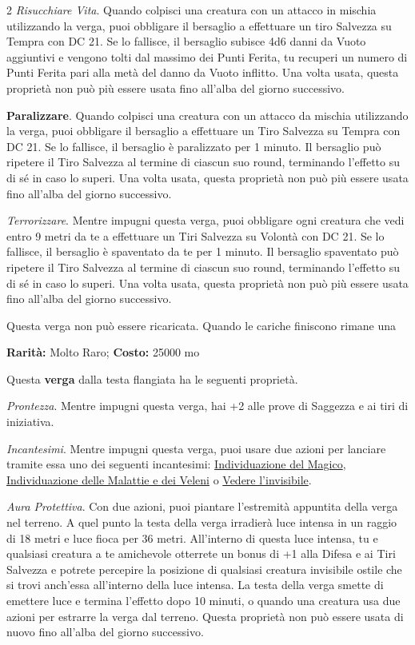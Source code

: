 \begin{multicols}{2}
\emph{Risucchiare Vita}. Quando colpisci una creatura con un attacco in mischia utilizzando la verga, puoi obbligare il bersaglio a effettuare un tiro Salvezza su Tempra con DC 21. Se lo fallisce, il bersaglio subisce 4d6 danni da Vuoto aggiuntivi e vengono tolti dal massimo dei Punti Ferita, tu recuperi un numero di Punti Ferita pari alla metà del danno da Vuoto inflitto. Una volta usata, questa proprietà non può più essere usata fino all'alba del giorno successivo.

\textbf{Paralizzare}. Quando colpisci una creatura con un attacco da mischia utilizzando la verga, puoi obbligare il bersaglio a effettuare un Tiro Salvezza su Tempra con DC 21. Se lo fallisce, il bersaglio è paralizzato per 1 minuto. Il bersaglio può ripetere il Tiro Salvezza al termine di ciascun suo round, terminando l'effetto su di sé in caso lo superi. Una volta usata, questa proprietà non può più essere usata fino all'alba del giorno successivo.

\emph{Terrorizzare}. Mentre impugni questa verga, puoi obbligare ogni creatura che vedi entro 9 metri da te a effettuare un Tiri Salvezza su Volontà con DC 21. Se lo fallisce, il bersaglio è spaventato da te per 1 minuto. Il bersaglio spaventato può ripetere il Tiro Salvezza al termine di ciascun suo round, terminando l'effetto su di sé in caso lo superi. Una volta usata, questa proprietà non può più essere usata fino all'alba del giorno successivo.

Questa verga non può essere ricaricata. Quando le cariche finiscono rimane una


\textbf{Rarità:} Molto Raro; \textbf{Costo:} 25000 mo

Questa \textbf{verga} dalla testa flangiata ha le seguenti proprietà.

\emph{Prontezza}. Mentre impugni questa verga, hai +2 alle prove di Saggezza e ai tiri di iniziativa.

\emph{Incantesimi}. Mentre impugni questa verga, puoi usare due azioni per lanciare tramite essa uno dei seguenti incantesimi: \hyperlink{Individuazione del Magico}{Individuazione del Magico}, \hyperlink{Individuazione delle Malattie e dei Veleni}{Individuazione delle Malattie e dei Veleni} o \hyperlink{Vedere l'invisibile}{Vedere l'invisibile}.

\emph{Aura Protettiva}. Con due azioni, puoi piantare l'estremità appuntita della verga nel terreno. A quel punto la testa della verga irradierà luce intensa in un raggio di 18 metri e luce fioca per 36 metri. All'interno di questa luce intensa, tu e qualsiasi creatura a te amichevole otterrete un bonus di +1 alla Difesa e ai Tiri Salvezza e potrete percepire la posizione di qualsiasi creatura invisibile ostile che si trovi anch'essa all'interno della luce intensa. La testa della verga smette di emettere luce e termina l'effetto dopo 10 minuti, o quando una creatura usa due azioni per estrarre la verga dal terreno. Questa proprietà non può essere usata di nuovo fino all'alba del giorno successivo.


\end{multicols}
